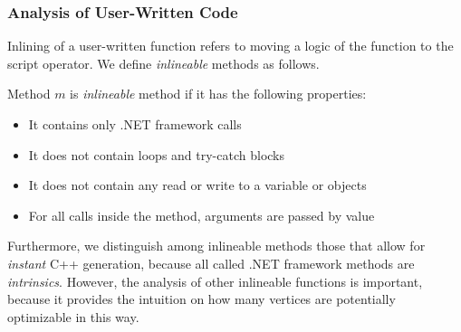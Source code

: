\subsubsection{Analysis of User-Written Code}
\label{sec:analysisUser}
Inlining of a user-written function refers to moving a logic of the function to the script operator. We define \emph{inlineable} methods as follows.
\begin{definition}
Method $m$ is \emph{inlineable} method if it has the following properties:
\begin{itemize}
\item It contains only .NET framework calls
\item It does not contain loops and try-catch blocks
\item It does not contain any read or write to a variable or objects
\item For all calls inside the method, arguments are passed by value
\end{itemize}


\end{definition}

Furthermore, we distinguish among inlineable methods those that allow for \emph{instant} C++ generation, because all called .NET framework methods are \emph{intrinsics}. However, the analysis of other inlineable functions is important, because it provides the intuition on how many vertices are potentially optimizable in this way.


